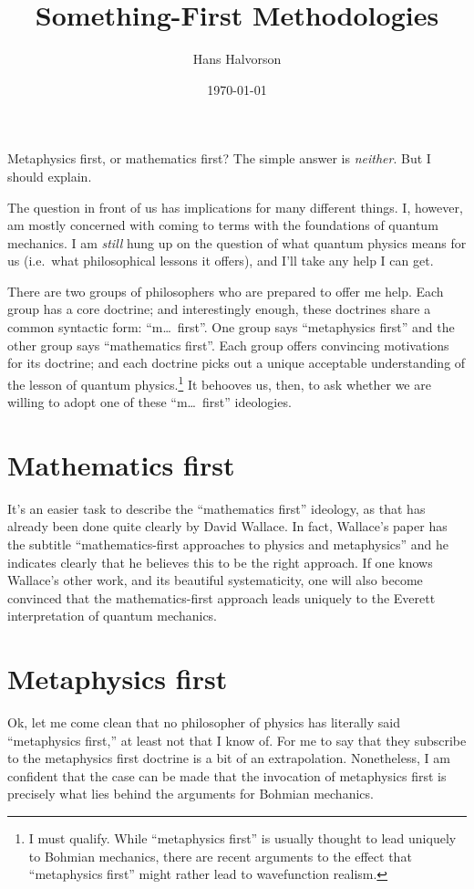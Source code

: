\documentclass[12pt]{article}
\title{Something-First Methodologies}
\author{Hans Halvorson}
\date{\today}
\begin{document}
\maketitle

Metaphysics first, or mathematics first? The simple answer is
\emph{neither}. But I should explain.

The question in front of us has implications for many different
things. I, however, am mostly concerned with coming to terms with the
foundations of quantum mechanics. I am \emph{still} hung up on the
question of what quantum physics means for us (i.e.\ what
philosophical lessons it offers), and I'll take any help I can get.

There are two groups of philosophers who are prepared to offer me
help. Each group has a core doctrine; and interestingly enough, these
doctrines share a common syntactic form: ``m\dots\ first''. One group
says ``metaphysics first'' and the other group says ``mathematics
first''. Each group offers convincing motivations for its doctrine;
and each doctrine picks out a unique acceptable understanding of the
lesson of quantum physics.\footnote{I must qualify. While
  ``metaphysics first'' is usually thought to lead uniquely to Bohmian
  mechanics, there are recent arguments to the effect that
  ``metaphysics first'' might rather lead to wavefunction realism.} It
behooves us, then, to ask whether we are willing to adopt one of these
``m\dots\ first'' ideologies.

\section{Mathematics first}

It's an easier task to describe the ``mathematics first'' ideology, as
that has already been done quite clearly by David Wallace. In fact,
Wallace's paper has the subtitle ``mathematics-first approaches to
physics and metaphysics'' and he indicates clearly that he believes
this to be the right approach. If one knows Wallace's other work, and
its beautiful systematicity, one will also become convinced that the
mathematics-first approach leads uniquely to the Everett
interpretation of quantum mechanics.

\section{Metaphysics first}



Ok, let me come clean that no philosopher of physics has literally
said ``metaphysics first,'' at least not that I know of. For me to say
that they subscribe to the metaphysics first doctrine is a bit of an
extrapolation. Nonetheless, I am confident that the case can be made
that the invocation of metaphysics first is precisely what lies behind
the arguments for Bohmian mechanics.
\end{document}
